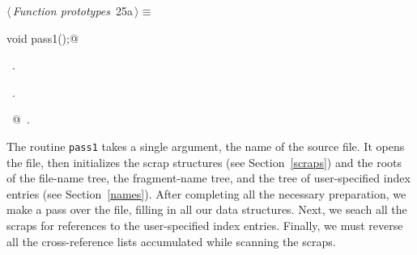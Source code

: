 \documentclass[a4paper]{report}
\begin{document}
\begin{flushleft} \small
\begin{minipage}{\linewidth}\label{scrap36}\raggedright\small
{} $\langle\,${\it Function prototypes}\nobreak\ {\footnotesize {25a}}$\,\rangle\equiv$
\vspace{-1ex}
\begin{list}{}{} \item
\mbox{}\verb@extern void pass1();@\\
\mbox{}\verb@@{\NWsep}
\end{list}
\vspace{-1.5ex}
\footnotesize
\begin{list}{}{\setlength{\itemsep}{-\parsep}\setlength{\itemindent}{-\leftmargin}}
\item \NWtxtMacroDefBy\ .
\item \NWtxtMacroRefIn\ .
\item \NWtxtIdentsUsed\nobreak\  @\nobreak\ .
\item{}
\end{list}
\end{minipage}\vspace{4ex}
\end{flushleft}
The routine \verb|pass1| takes a single argument, the name of the
source file. It opens the file, then initializes the scrap structures
(see Section~\ref{scraps}) and the roots of the file-name tree, the
fragment-name tree, and the tree of user-specified index entries (see
Section~\ref{names}). After completing all the
necessary preparation, we make a pass over the file, filling in all
our data structures. Next, we seach all the scraps for references to
the user-specified index entries. Finally, we must reverse all the
cross-reference lists accumulated while scanning the scraps.
\end{document}
